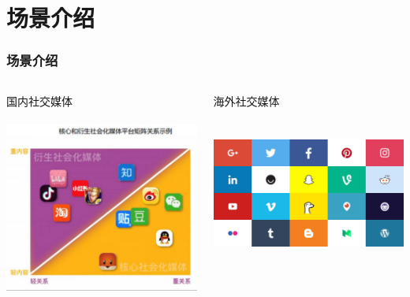 \documentclass[../Postbot.tex]{subfiles}
\begin{document}
    \section*{场景介绍}
    \begin{frame}
        \frametitle{场景介绍}
        \begin{columns}
            \begin{column}{.4\linewidth}
                国内社交媒体 \\
                \hspace*{\fill} \\
                \includegraphics[scale=0.2]{../src/img/Social_media_mainland.png}

            \end{column}
            \begin{column}{.4\linewidth}
                海外社交媒体 \\
                \hspace*{\fill} \\
                \hspace*{\fill} \\
                \includegraphics[scale=0.07]{../src/img/Social_media_oversea.jpg}

            \end{column}
        \end{columns}
    \end{frame}
\end{document}
